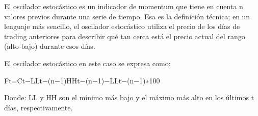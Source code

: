 \documentclass[11pt]{article}
\begin{document}
El oscilador estocástico es un indicador de momentum que tiene en cuenta n valores previos durante una serie de tiempo. Esa es la definición técnica; en un lenguaje más sencillo, el oscilador estocástico utiliza el precio de los días de trading anteriores para describir qué tan cerca está el precio actual del rango (alto-bajo) durante esos días.

El oscilador estocástico en este caso se expresa como:

Ft=Ct−LLt−(n−1)HHt−(n−1)−LLt−(n−1)∗100 

Donde: LL y HH son el mínimo más bajo y el máximo más alto en los últimos t días, respectivamente.
\end{document}
